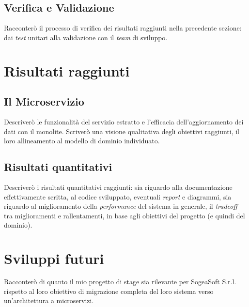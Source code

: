         \subsection{Verifica e Validazione}
        Racconterò il processo di verifica dei risultati raggiunti nella precedente sezione: dai \textit{test} unitari alla validazione con il \textit{team} di sviluppo.
    \section{Risultati raggiunti}
        \subsection{Il Microservizio}
        Descriverò le funzionalità del servizio estratto e l'efficacia dell'aggiornamento dei dati con il monolite.
        Scriverò una visione qualitativa degli obiettivi raggiunti, il loro allineamento al modello di dominio individuato.
        \subsection{Risultati quantitativi}
        Descriverò i risultati quantitativi raggiunti: sia riguardo alla documentazione effettivamente scritta, al codice sviluppato, eventuali \textit{report} e diagrammi, sia riguardo al miglioramento della \textit{performance} del sistema in generale, il \textit{tradeoff} tra miglioramenti e rallentamenti, in base agli obiettivi del progetto (e quindi del dominio).
    \section{Sviluppi futuri}
    Racconterò di quanto il mio progetto di stage sia rilevante per SogeaSoft S.r.l. rispetto al loro obiettivo di migrazione completa del loro sistema verso un'architettura a microservizi.

    
    